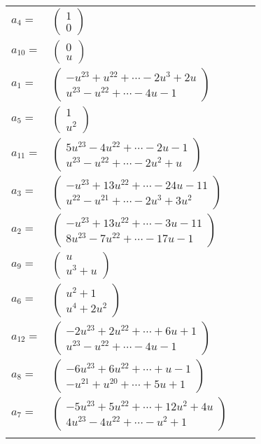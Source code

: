 \documentclass[1p]{elsarticle_modified}
\theoremstyle{definition}
\begin{document}
\begin{tabular}{m{7pt} m{180pt} m{7pt} m{180pt} }
\flushright $a_{4}=$&$\begin{pmatrix}1\\0\end{pmatrix}$ \\
\flushright $a_{10}=$&$\begin{pmatrix}0\\u\end{pmatrix}$ \\
\flushright $a_{1}=$&$\begin{pmatrix}- u^{23}+u^{22}+\cdots-2 u^3+2 u\\u^{23}- u^{22}+\cdots-4 u-1\end{pmatrix}$ \\
\flushright $a_{5}=$&$\begin{pmatrix}1\\u^2\end{pmatrix}$ \\
\flushright $a_{11}=$&$\begin{pmatrix}5 u^{23}-4 u^{22}+\cdots-2 u-1\\u^{23}- u^{22}+\cdots-2 u^2+u\end{pmatrix}$ \\
\flushright $a_{3}=$&$\begin{pmatrix}- u^{23}+13 u^{22}+\cdots-24 u-11\\u^{22}- u^{21}+\cdots-2 u^3+3 u^2\end{pmatrix}$ \\
\flushright $a_{2}=$&$\begin{pmatrix}- u^{23}+13 u^{22}+\cdots-3 u-11\\8 u^{23}-7 u^{22}+\cdots-17 u-1\end{pmatrix}$ \\
\flushright $a_{9}=$&$\begin{pmatrix}u\\u^3+u\end{pmatrix}$ \\
\flushright $a_{6}=$&$\begin{pmatrix}u^2+1\\u^4+2 u^2\end{pmatrix}$ \\
\flushright $a_{12}=$&$\begin{pmatrix}-2 u^{23}+2 u^{22}+\cdots+6 u+1\\u^{23}- u^{22}+\cdots-4 u-1\end{pmatrix}$ \\
\flushright $a_{8}=$&$\begin{pmatrix}-6 u^{23}+6 u^{22}+\cdots+u-1\\- u^{21}+u^{20}+\cdots+5 u+1\end{pmatrix}$ \\
\flushright $a_{7}=$&$\begin{pmatrix}-5 u^{23}+5 u^{22}+\cdots+12 u^2+4 u\\4 u^{23}-4 u^{22}+\cdots- u^2+1\end{pmatrix}$\\&\end{tabular}
\end{document}
